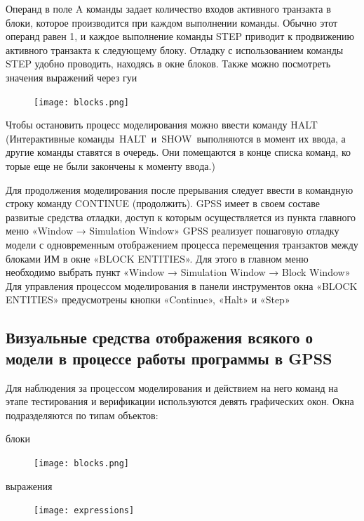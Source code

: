 \documentclass[14pt]{extarticle}
\begin{document}
Операнд в поле A команды задает количество входов активного транзакта в блоки, которое производится при каждом выполнении команды. Обычно этот операнд равен 1, и каждое выполнение команды STEP приводит к продвижению активного транзакта к следующему блоку. Отладку с использованием команды STEP удобно проводить, находясь в окне блоков. Также можно посмотреть значения выражений через гуи


\begin{figure}[h!]
    \centering
    \texttt{[image: blocks.png]}
\end{figure}


Чтобы остановить процесс моделирования можно ввести команду HALT (Интерактивные команды HALT и SHOW выполняются в момент их ввода, а другие команды ставятся в очередь. Они помещаются в конце списка команд, ко торые еще не были закончены к моменту ввода.)

Для продолжения моделирования после прерывания следует ввести в командную строку команду CONTINUE (продолжить). GPSS имеет в своем составе развитые средства отладки, доступ к которым осуществляется из пункта главного меню «Window → Simulation Window» GPSS реализует пошаговую отладку модели с одновременным отображением процесса перемещения транзактов между блоками ИМ в окне «BLOCK ENTITIES». Для этого в главном меню необходимо выбрать пункт «Window → Simulation Window → Block Window» Для управления процессом моделирования в панели инструментов окна «BLOCK ENTITIES» предусмотрены кнопки «Continue», «Halt» и «Step»

\subsection*{Визуальные средства отображения всякого о модели в процессе работы программы в GPSS}

Для наблюдения за процессом моделирования и действием на него команд на этапе тестирования и верификации используются девять графических окон. Окна подразделяются по типам объектов:

\newpage

блоки

\begin{figure}[h!]
    \centering
    \texttt{[image: blocks.png]}
\end{figure}



выражения

\begin{figure}[h!]
    \centering
    \texttt{[image: expressions]}
\end{figure}
\end{document}
